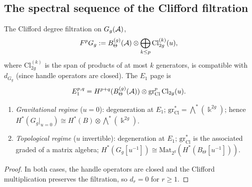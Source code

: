 %
%

\subsection{The spectral sequence of the Clifford filtration}

\begin{construction}
The Clifford degree filtration on $G_g(\mathcal{A})$,
\begin{equation}%
F^p G_g := B_\Theta^{(g)}(\cA) \otimes
\bigoplus_{k \leq p} \mathrm{Cl}_{2g}^{(k)}(u),
\end{equation}
where $\mathrm{Cl}_{2g}^{(k)}$ is the span of products of at most $k$
generators, is compatible with $d_{G_g}$ (since handle operators are
closed). The $E_1$ page is
\begin{equation}%
E_1^{p,q} = H^{p+q}(B_\Theta^{(g)}(\cA))
\otimes \mathrm{gr}^p_{\mathrm{Cl}}\,\mathrm{Cl}_{2g}(u).
\end{equation}
\end{construction}

\begin{proposition}
\begin{enumerate}[label=\textup{(\roman*)}]
\item \emph{Gravitational regime} ($u = 0$): degeneration at $E_1$;
$\mathrm{gr}_{\mathrm{Cl}}^* = \bigwedge^*(\Bbbk^{2g})$; hence
$H^*(G_g|_{u=0}) \cong H^*(B) \otimes \bigwedge^*(\Bbbk^{2g})$.

\item \emph{Topological regime} ($u$ invertible): degeneration at
$E_1$; $\mathrm{gr}_{\mathrm{Cl}}^*$ is the associated graded of a
matrix algebra; $H^*(G_g[u^{-1}]) \cong
\mathrm{Mat}_{2^g}(H^*(B_\Theta[u^{-1}]))$.
\end{enumerate}
\end{proposition}

\begin{proof}
In both cases, the handle operators are closed and the Clifford
multiplication preserves the filtration, so $d_r = 0$ for $r \geq 1$.
\end{proof}

